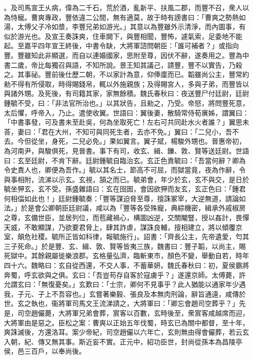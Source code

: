 \begin{pinyinscope}
。及司馬宣王乆病，偉為二千石，荒於酒，亂新平、扶風二郡，而豐不召，衆人以為恃寵。曹爽專政，豐依違二公間，無有適莫，故于時有謗書曰：「曹爽之勢熱如湯，太傅父子冷如漿，李豐兄弟如游光。」其意以為豐雖外示清淨，而內圖事，有似於游光也。及宣王奏誅爽，住車闕下，與豐相聞，豐怖，遽氣索，足委地不能起。至嘉平四年宣王終後，中書令缺，大將軍諮問朝臣：「誰可補者？」或指向豐。豐雖知此非顯選，而自以連婚國家，思附至尊，因伏不辭，遂奏用之。豐為中書二歲，帝比每獨召與語，不知所說。景王知其議己，請豐，豐不以實告，乃殺之。其事祕。豐前後仕歷二朝，不以家計為意，仰俸廩而已。韜雖尚公主，豐常約勑不得有所侵取，時得賜錢帛，輒以外施親族；及得賜宮人，多與子弟，而豐皆以與諸外甥。及死後，有司籍其家，家無餘積。魏氏春秋曰：夜送豐尸付廷尉，廷尉鍾毓不受，曰：「非法官所治也。」以其狀告，且勑之，乃受。帝怒，將問豐死意，太后懼，呼帝入，乃止。遣使收翼。世語曰：翼後妻，散騎常侍荀廙姊，謂翼曰：「中書事發，可及書未至赴吳，何為坐取死亡！左右可共同赴水火者誰？」翼思未荅，妻曰：「君在大州，不知可與同死生者，去亦不免。」翼曰：「二兒小，吾不去。今但從坐，身死，二兒必免。」果如翼言。翼子斌，楊駿外甥也。晉惠帝初，為河南尹，與駿俱死，見晉書。事下有司，收玄、緝、鑠、敦、賢等送廷尉。世語曰：玄至廷尉，不肯下辭。廷尉鍾毓自臨治玄。玄正色責毓曰：「吾當何辭？卿為令史責人也，卿便為吾作。」毓以其名士，節高不可屈，而獄當竟，夜為作辭，令與事相附，流涕以示玄。玄視，頷之而已。毓弟會，年少於玄，玄不與交，是日於毓坐狎玄，玄不受。孫盛雜語曰：玄在囹圄，會因欲狎而友玄，玄正色曰：「鍾君何相偪如此也！」廷尉鍾毓奏：「豐等謀迫脅至尊，擅誅冢宰，大逆無道，請論如法。」於是會公卿朝臣廷尉議，咸以為「豐等各受殊寵，典綜機密，緝承外戚椒房之尊，玄備世臣，並居列位，而苞藏禍心，構圖凶逆，交關閹豎，授以姦計，畏憚天威，不敢顯謀，乃欲要君脅上，肆其詐虐，謀誅良輔，擅相建立，將以傾覆京室，顛危社稷。毓所正皆如科律，報毓施行」。詔書：「齊長公主，先帝遺愛，匄其三子死命。」於是豐、玄、緝、敦、賢等皆夷三族，魏書曰：豐子韜，以尚主，賜死獄中。其餘親屬徙樂浪郡。玄格量弘濟，臨斬東巿，顏色不變，舉動自若，時年四十六。魏略曰：玄自從西還，不交人事，不蓄華妍。魏氏春秋曰：初，夏侯霸將奔蜀，呼玄欲與之俱。玄曰：「吾豈苟存自客於寇虜乎？」遂還京師。太傅薨，許允謂玄曰：「無復憂矣。」玄歎曰：「士宗，卿何不見事乎？此人猶能以通家年少遇我，子元、子上不吾容也。」玄嘗著樂毅、張良及本無肉刑論，辭旨通遠，咸傳於世。玄之執也，衞將軍司馬文王流涕請之，大將軍曰：「卿忘會趙司空葬乎？」先是，司空趙儼薨，大將軍兄弟會葬，賔客以百數，玄時後至，衆賔客咸越席而迎，大將軍由是惡之。臣松之案：曹爽以正始五年伐蜀，時玄已為關中都督，至十年，爽誅滅後，方還洛耳。案少帝紀，司空趙儼以六年亡，玄則無由得會儼葬，若云玄入朝，紀、傳又無其事。斯近妄不實。正元中，紹功臣世，封尚從孫本為昌陵亭侯，邑三百戶，以奉尚後。


\end{pinyinscope}
